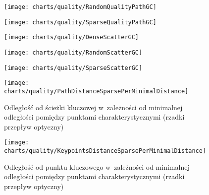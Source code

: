     \begin{figure}[!ht]
      \centering
      \texttt{[image: charts/quality/RandomQualityPathGC]}
      \caption[]
              {}
      \label{fig:RandomQualityPathGC}
    \end{figure}

    \begin{figure}[!ht]
      \centering
      \texttt{[image: charts/quality/SparseQualityPathGC]}
      \caption[]
              {}
      \label{fig:SparseQualityPathGC}
    \end{figure}

    \newpage
    \begin{figure}[!ht]
      \centering
      \texttt{[image: charts/quality/DenseScatterGC]}
      \caption[]
              {}
      \label{fig:DenseScatterGC}
    \end{figure}

    \begin{figure}[!ht]
      \centering
      \texttt{[image: charts/quality/RandomScatterGC]}
      \caption[]
              {}
      \label{fig:RandomScatterGC}
    \end{figure}

    \begin{figure}[!ht]
      \centering
      \texttt{[image: charts/quality/SparseScatterGC]}
      \caption[]
              {}
      \label{fig:SparseScatterGC}
    \end{figure}

    \newpage
    \begin{figure}[!ht]
      \centering
      \texttt{[image: charts/quality/PathDistanceSparsePerMinimalDistance]}
      \caption[Odległość od ścieżki kluczowej w~zależności od minimalnej odległości pomiędzy punktami charakterystycznymi]
              {Odległość od ścieżki kluczowej w~zależności od minimalnej odległości pomiędzy punktami charakterystycznymi (rzadki przepływ optyczny)}
      \label{fig:SpecialisedSparsePathDistance}
    \end{figure}

    \begin{figure}[!ht]
      \centering
      \texttt{[image: charts/quality/KeypointsDistanceSparsePerMinimalDistance]}
      \caption[Odległość od punktu kluczowego w~zależności od minimalnej odległości pomiędzy punktami charakterystycznymi]
              {Odległość od punktu kluczowego w~zależności od minimalnej odległości pomiędzy punktami charakterystycznymi (rzadki przepływ optyczny)}
      \label{fig:SpecialisedSparseKeypointsDistance}
    \end{figure}

